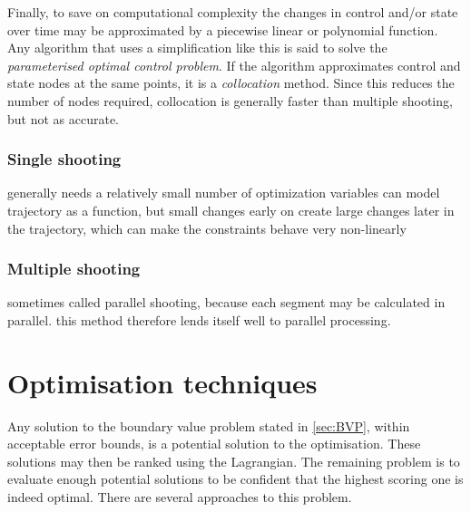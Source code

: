 Finally, to save on computational complexity the changes in control and/or state over time may be approximated by a piecewise linear or polynomial function. Any algorithm that uses a simplification like this is said to solve the \emph{parameterised optimal control problem}. If the algorithm approximates control and state nodes at the same points, it is a \emph{collocation} method. Since this reduces the number of nodes required, collocation is generally faster than multiple shooting, but not as accurate.%

\subsubsection{Single shooting}
generally needs a relatively small number of optimization variables
can model trajectory as a function, but small changes early on create large changes later in the trajectory, which can make the constraints behave very non-linearly \cite{Betts1998}
\subsubsection{Multiple shooting}
sometimes called parallel shooting, because each segment may be calculated in parallel. this method therefore lends itself well to parallel processing.


\section{Optimisation techniques}\label{sec:Techniques}

Any solution to the boundary value problem stated in \autoref{sec:BVP}, within acceptable error bounds, is a potential solution to the optimisation. These solutions may then be ranked using the Lagrangian. The remaining problem is to evaluate enough potential solutions to be confident that the highest scoring one is indeed optimal. There are several approaches to this problem.


